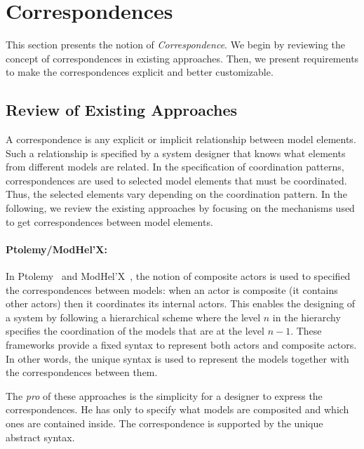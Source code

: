 \section{Correspondences}


This section presents the notion of \emph{Correspondence}. We begin by reviewing the concept of correspondences in existing approaches. Then, we present requirements to make the correspondences explicit and better customizable.  

\subsection{Review of Existing Approaches}
A correspondence is any explicit or implicit relationship between model elements. Such a relationship is specified by a system designer that knows what elements from different models are related. In the specification of coordination patterns, correspondences are used to selected model elements that must be coordinated. Thus, the selected elements vary depending on the coordination pattern. In the following, we review the existing approaches by focusing on the mechanisms used to get correspondences between model elements.      

\paragraph{Ptolemy/ModHel'X: }
In Ptolemy~\cite{ptoleframebib} and ModHel'X~\cite{modhelxbib}, the notion of composite actors is used to specified the correspondences between models: when an actor is composite (\ie it contains other actors) then it coordinates its internal actors. This enables the designing of a system by following a hierarchical scheme where the level $n$ in the hierarchy specifies the coordination of the models that are at the level $n-1$. These frameworks provide a fixed syntax to represent both actors and composite actors. In other words, the unique syntax is used to represent the models together with the correspondences between them. 

The \emph{pro} of these approaches is the simplicity for a designer to express the correspondences. He has only to specify what models are composited and which ones are contained inside. The correspondence is supported by the unique abstract syntax. 

